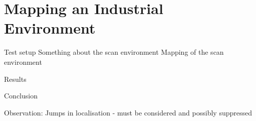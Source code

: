 \section{Mapping an Industrial Environment}

Test setup 
Something about the scan environment
Mapping of the scan environment

Results

Conclusion

Observation: Jumps in localisation - must be considered and possibly suppressed
